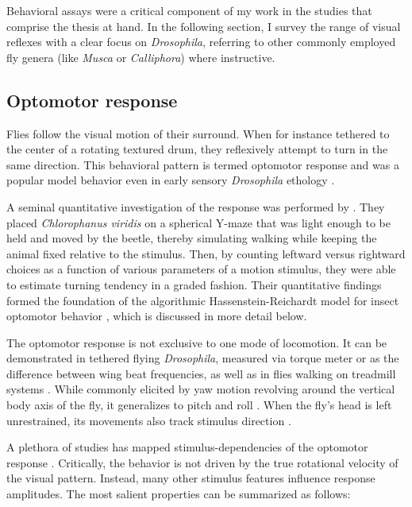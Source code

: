 Behavioral assays were a critical component of my work in the studies that comprise the thesis at hand. In the following section, I survey the range of visual reflexes with a clear focus on \textit{Drosophila}, referring to other commonly employed fly genera (like \textit{Musca} or \textit{Calliphora}) where instructive.

\subsection{Optomotor response}
Flies follow the visual motion of their surround. When for instance tethered to the center of a rotating textured drum, they reflexively attempt to turn in the same direction. This behavioral pattern is termed optomotor response and was a popular model behavior even in early sensory \textit{Drosophila} ethology \citep{Hecht:1934aa,Kalmus:1943aa}.

A seminal quantitative investigation of the response was performed by \citet{Hassenstein:1956fa}. They placed \textit{Chlorophanus viridis} on a spherical Y-maze that was light enough to be held and moved by the beetle, thereby simulating walking while keeping the animal fixed relative to the stimulus. Then, by counting leftward versus rightward choices as a function of various parameters of a motion stimulus, they were able to estimate turning tendency in a graded fashion. Their quantitative findings formed the foundation of the algorithmic Hassenstein-Reichardt model for insect optomotor behavior \citep{Reichardt:1961aa}, which is discussed in more detail below.

The optomotor response is not exclusive to one mode of locomotion. It can be demonstrated in tethered flying \textit{Drosophila}, measured via torque meter or as the difference between wing beat frequencies, as well as in flies walking on treadmill systems \citep{Buchner:1976kd,Gotz:1964bj,Fermi:1963aa,Goetz:1973aa,Goetz:1987aa}. While commonly elicited by yaw motion revolving around the vertical body axis of the fly, it generalizes to pitch and roll \citep{Blondeau:1982hd}. When the fly's head is left unrestrained, its movements also track stimulus direction \citep{Hengstenberg:1988kg,Haikala:2013cm}.

A plethora of studies has mapped stimulus-dependencies of the optomotor response \citep[see][]{Borst:2010fk}. Critically, the behavior is not driven by the true rotational velocity of the visual pattern. Instead, many other stimulus features influence response amplitudes. The most salient properties can be summarized as follows:

